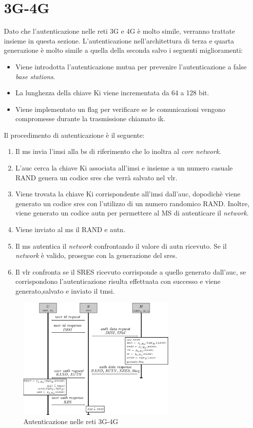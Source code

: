 \section{3G-4G}
Dato che l'autenticazione nelle reti 3G e 4G è molto simile, verranno trattate insieme in questa sezione.
L'autenticazione nell'architettura di terza e quarta generazione è molto simile a quella della seconda salvo i seguenti miglioramenti:
\begin{itemize}
    \item Viene introdotta l'autenticazione mutua per prevenire l'autenticazione a false \textit{base stations}.
    \item La lunghezza della chiave Ki viene incrementata da 64 a 128 bit.
    \item Viene implementato un flag per verificare se le comunicazioni vengono compromesse durante la trasmissione chiamato \gls{ik}.
\end{itemize}
Il procedimento di autenticazione è il seguente\cite{4g-auth}:
\begin{enumerate}
    \item Il \gls{ms} invia l'\gls{imsi} alla \gls{bs} di riferimento che lo inoltra al \textit{core network}.
    \item L'\gls{auc} cerca la chiave Ki associata all'\gls{imsi} e insieme a un numero casuale RAND genera un codice \gls{sres} che verrà
    salvato nel \gls{vlr}.
    \item Viene trovata la chiave Ki corrispondente all'\gls{imsi} dall'\gls{auc}, dopodichè viene generato un codice \gls{sres} con l'utilizzo di un numero randomico RAND.
    Inoltre, viene generato un codice \gls{autn} per permettere al MS di autenticare il \textit{network}.
    \item Viene inviato al \gls{ms} il RAND e \gls{autn}.
    \item Il \gls{ms} autentica il \textit{network} confrontando il valore di \gls{autn} ricevuto. Se il \textit{network} è valido, prosegue con la generazione del \gls{sres}.
    \item Il \gls{vlr} confronta se il SRES ricevuto corrisponde a quello generato dall'\gls{auc}, se corrispondono l'autenticazione risulta
    effettuata con successo e viene generato,salvato e inviato il \gls{tmsi}.
\end{enumerate}
\begin{figure}[h]
    \centering
    \includegraphics[width=0.7\textwidth]{images/auth-3g.png}
    \caption{Autenticazione nelle reti 3G-4G}
\end{figure}

